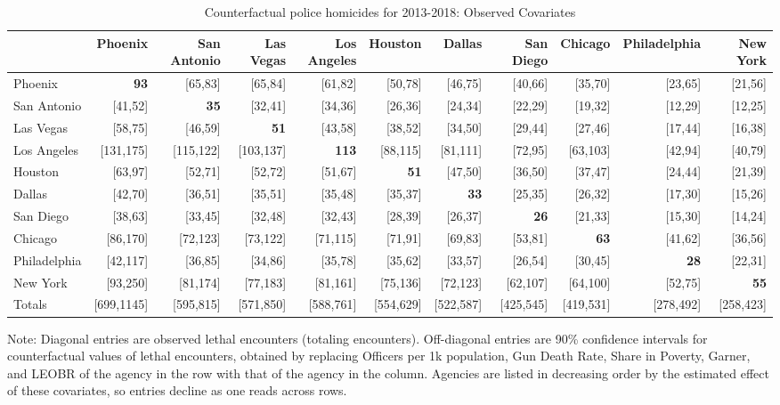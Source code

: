 \begin{table}[h!]\centering\scriptsize\tabcolsep=0.1cm\caption{Counterfactual police homicides for 2013-2018: Observed Covariates} \label{table:counterfactual_obs}\begin{tabular}{lrrrrrrrrrr}\hline \hline&Phoenix&San Antonio&Las Vegas&Los Angeles&Houston&Dallas&San Diego&Chicago&Philadelphia&New York\\
\hline
Phoenix&\textbf{93}&[65,83]&[65,84]&[61,82]&[50,78]&[46,75]&[40,66]&[35,70]&[23,65]&[21,56]\\
San Antonio&[41,52]&\textbf{35}&[32,41]&[34,36]&[26,36]&[24,34]&[22,29]&[19,32]&[12,29]&[12,25]\\
Las Vegas&[58,75]&[46,59]&\textbf{51}&[43,58]&[38,52]&[34,50]&[29,44]&[27,46]&[17,44]&[16,38]\\
Los Angeles&[131,175]&[115,122]&[103,137]&\textbf{113}&[88,115]&[81,111]&[72,95]&[63,103]&[42,94]&[40,79]\\
Houston&[63,97]&[52,71]&[52,72]&[51,67]&\textbf{51}&[47,50]&[36,50]&[37,47]&[24,44]&[21,39]\\
Dallas&[42,70]&[36,51]&[35,51]&[35,48]&[35,37]&\textbf{33}&[25,35]&[26,32]&[17,30]&[15,26]\\
San Diego&[38,63]&[33,45]&[32,48]&[32,43]&[28,39]&[26,37]&\textbf{26}&[21,33]&[15,30]&[14,24]\\
Chicago&[86,170]&[72,123]&[73,122]&[71,115]&[71,91]&[69,83]&[53,81]&\textbf{63}&[41,62]&[36,56]\\
Philadelphia&[42,117]&[36,85]&[34,86]&[35,78]&[35,62]&[33,57]&[26,54]&[30,45]&\textbf{28}&[22,31]\\
New York&[93,250]&[81,174]&[77,183]&[81,161]&[75,136]&[72,123]&[62,107]&[64,100]&[52,75]&\textbf{55}\\
\hline
Totals&[699,1145]&[595,815]&[571,850]&[588,761]&[554,629]&[522,587]&[425,545]&[419,531]&[278,492]&[258,423]\\
\hline 
 \end{tabular} 
 \begin{center} 
 \begin{minipage}{1.05\textwidth} %
 {\footnotesize Note: Diagonal entries are observed lethal encounters (totaling \totalincidentsten{} encounters). Off-diagonal entries are 90\% confidence intervals for counterfactual values of lethal encounters, obtained by replacing Officers per 1k population, Gun Death Rate, Share in Poverty, Garner, and LEOBR of the agency in the row with that of the agency in the column. Agencies are listed in decreasing order by the estimated effect of these covariates, so entries decline as one reads across rows.} 
 \end{minipage} 
 \end{center} 
 \end{table}